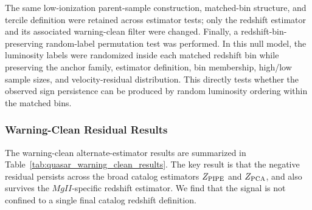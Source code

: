 \documentclass[11pt]{article}
\renewcommand{\arraystretch}{1.22}
\renewcommand{\arraystretch}{1.4}
\begin{document}
The same low-ionization parent-sample construction, matched-bin structure, and
tercile definition were retained across estimator tests; only the redshift
estimator and its associated warning-clean filter were changed. Finally, a redshift-bin-preserving random-label permutation test was performed. In this null model, the luminosity labels were randomized inside each matched redshift bin while preserving the anchor family, estimator definition, bin
membership, high/low sample sizes, and velocity-residual distribution. This
directly tests whether the observed sign persistence can be produced by random
luminosity ordering within the matched bins.

\subsubsection{Warning-Clean Residual Results}

The warning-clean alternate-estimator results are summarized in Table~\ref{tab:quasar_warning_clean_results}. The key result is that the negative residual persists across the broad catalog estimators \(Z_{\rm PIPE}\) and \(Z_{\rm PCA}\), and also survives the \(MgII\)-specific redshift estimator. We find that the signal is not confined to a single final catalog redshift definition.

\begin{table}[H]
\centering
\scriptsize
\caption{
\label{tab:quasar_warning_clean_results}
\textbf{Warning-clean strict low-ionization quasar residual test.}
Each row reports the combined strict low-ionization matched-bin result after applying the relevant redshift-warning cut. The PR prediction is \(\Delta v_{\rm high-low}<0\).
}
\renewcommand{\arraystretch}{1.16}
\end{table}
\end{document}
